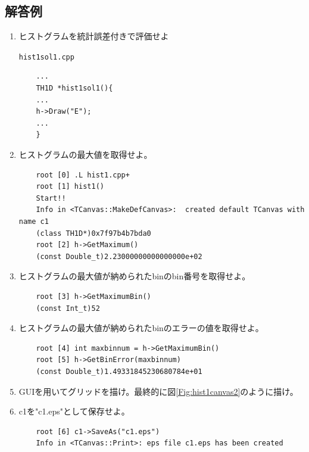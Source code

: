 \documentclass{jarticle}
\begin{document}
  \subsection{解答例}
  \begin{enumerate}
   \item ヒストグラムを統計誤差付きで評価せよ
	 \begin{itembox}{\texttt{hist1sol1.cpp}}
\begin{verbatim}
	...
	TH1D *hist1sol1(){
	...
	h->Draw("E");
	...
	}
\end{verbatim}
	 \end{itembox}

   \item ヒストグラムの最大値を取得せよ。
\begin{verbatim}
	root [0] .L hist1.cpp+
	root [1] hist1()
	Start!!
	Info in <TCanvas::MakeDefCanvas>:  created default TCanvas with name c1
	(class TH1D*)0x7f97b4b7bda0
	root [2] h->GetMaximum()
	(const Double_t)2.23000000000000000e+02
\end{verbatim}
   \item ヒストグラムの最大値が納められたbinのbin番号を取得せよ。
\begin{verbatim}
	root [3] h->GetMaximumBin()
	(const Int_t)52
\end{verbatim}
   \item ヒストグラムの最大値が納められたbinのエラーの値を取得せよ。
\begin{verbatim}
	root [4] int maxbinnum = h->GetMaximumBin()
	root [5] h->GetBinError(maxbinnum)
	(const Double_t)1.49331845230680784e+01
\end{verbatim}
   \item GUIを用いてグリッドを描け。最終的に図\ref{Fig:hist1canvas2}のように描け。

   \item c1を"c1.eps"として保存せよ。
\begin{verbatim}
	root [6] c1->SaveAs("c1.eps")
	Info in <TCanvas::Print>: eps file c1.eps has been created
\end{verbatim}
  \end{enumerate}


  \clearpage
\end{document}
